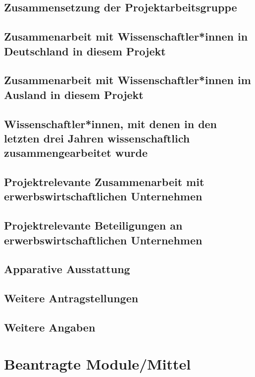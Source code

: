 \documentclass[german, 53.01]{proposal}
\begin{document}
\subsection{Zusammensetzung der Projektarbeitsgruppe}

\subsection{Zusammenarbeit mit Wissenschaftler*innen in Deutschland in diesem Projekt}

\subsection{Zusammenarbeit mit Wissenschaftler*innen im Ausland in diesem Projekt}

\subsection{Wissenschaftler*innen, mit denen in den letzten drei Jahren wissenschaftlich zusammengearbeitet wurde}

\subsection{Projektrelevante Zusammenarbeit mit erwerbswirtschaftlichen Unternehmen}

\subsection{Projektrelevante Beteiligungen an erwerbswirtschaftlichen Unternehmen}

\subsection{Apparative Ausstattung}

\subsection{Weitere Antragstellungen}

\subsection{Weitere Angaben}


\section{Beantragte Module/Mittel}
\end{document}
